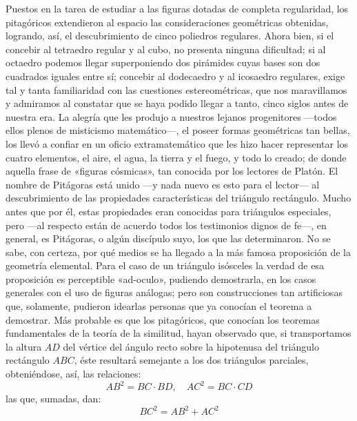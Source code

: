 \documentclass[a4paper, 12pt, draft]{article}
\begin{document}
{Puestos en la tarea de estudiar a las figuras dotadas de completa regularidad, los pitagóricos extendieron al espacio las consideraciones geométricas
obtenidas, logrando, así, el descubrimiento de cinco
poliedros regulares. Ahora bien, si el concebir al
tetraedro regular y al cubo, no presenta ninguna dificultad; si al octaedro podemos llegar superponiendo
dos pirámides cuyas bases son dos cuadrados iguales entre sí; concebir al dodecaedro y al icosaedro
regulares, exige tal y tanta familiaridad con las
cuestiones estereométricas, que nos maravillamos y
admiramos al constatar que se haya podido llegar
a tanto, cinco siglos antes de nuestra era. La alegría
que les produjo a nuestros lejanos progenitores ---todos ellos plenos de misticismo matemático---, el
poseer formas geométricas tan bellas, los llevó a
confiar en un oficio extramatemático que les hizo
hacer representar los cuatro elementos, el aire, el
agua, la tierra y el fuego, y todo lo creado; de donde
aquella frase de «figuras cósmicas», tan conocida
por los lectores de Platón. El nombre de Pitágoras está unido ---y nada nuevo es esto para el lector--- al descubrimiento de las propiedades características del triángulo rectángulo. Mucho antes que por él, estas propiedades eran conocidas para triángulos especiales, pero ---al respecto están de acuerdo todos los testimonios dignos de fe---, en general, es Pitágoras, o algún discípulo suyo, los que las determinaron. No se sabe, con certeza, por qué medios se ha llegado a la más famosa proposición de la geometría elemental. Para el caso de un triángulo isósceles la verdad de esa proposición es perceptible «ad-oculo», pudiendo demostrarla, en los casos generales con el uso de figuras análogas; pero son construcciones tan artificiosas que, solamente, pudieron idearlas personas que ya conocían el teorema a demostrar. Más probable es que  los pitagóricos, que conocían 
 los teoremas fundamentales de la teoría de la similitud, hayan observado que, si transportamos la altura $AD$ del vértice del ángulo recto sobre la hipotenusa del triángulo rectángulo $ABC$, éste resultará semejante a los dos triángulos parciales, obteniéndose, así, las relaciones:
 $$
 {AB}^2= BC \cdot BD, \quad {AC}^2= BC \cdot CD
 $$
 las que, sumadas, dan:
$$
{BC}^2 = {AB}^2 + {AC}^2
$$

}
\end{document}
